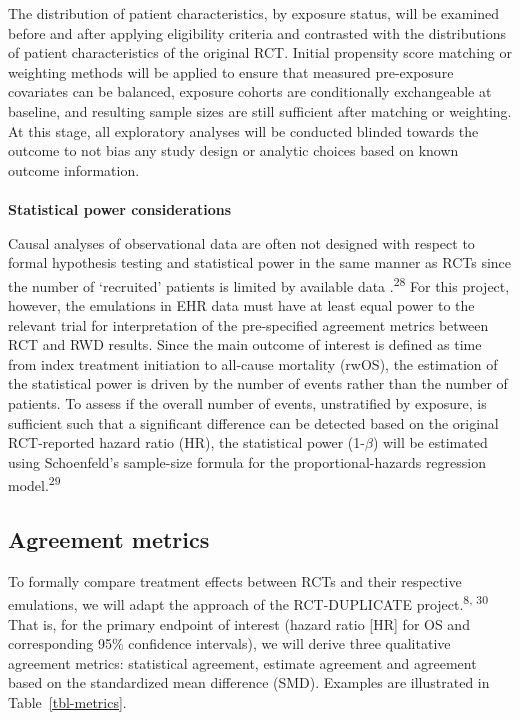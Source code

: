 \documentclass[
  letterpaper,
  DIV=11,
  numbers=noendperiod]{scrartcl}
\makeatletter
\let\oldparagraph\paragraph
\renewcommand{\paragraph}{
    \@ifstar
      \xxxParagraphStar
      \xxxParagraphNoStar
  }
\newcommand{\xxxParagraphStar}[1]{\oldparagraph*{#1}\mbox{}}
\newcommand{\xxxParagraphNoStar}[1]{\oldparagraph{#1}\mbox{}}
\makeatother
\begin{document}
The distribution of patient characteristics, by exposure status, will be
examined before and after applying eligibility criteria and contrasted
with the distributions of patient characteristics of the original RCT.
Initial propensity score matching or weighting methods will be applied
to ensure that measured pre-exposure covariates can be balanced,
exposure cohorts are conditionally exchangeable at baseline, and
resulting sample sizes are still sufficient after matching or weighting.
At this stage, all exploratory analyses will be conducted blinded
towards the outcome to not bias any study design or analytic choices
based on known outcome information.

\paragraph{\texorpdfstring{\textbf{Statistical power
considerations}}{Statistical power considerations}}\label{statistical-power-considerations}

Causal analyses of observational data are often not designed with
respect to formal hypothesis testing and statistical power in the same
manner as RCTs since the number of `recruited' patients is limited by
available data .\textsuperscript{28} For this project, however, the
emulations in EHR data must have at least equal power to the relevant
trial for interpretation of the pre-specified agreement metrics between
RCT and RWD results. Since the main outcome of interest is defined as
time from index treatment initiation to all-cause mortality (rwOS), the
estimation of the statistical power is driven by the number of events
rather than the number of patients. To assess if the overall number of
events, unstratified by exposure, is sufficient such that a significant
difference can be detected based on the original RCT-reported hazard
ratio (HR), the statistical power (1-\(\beta\)) will be estimated using
Schoenfeld's sample-size formula for the proportional-hazards regression
model.\textsuperscript{29}

\subsection{Agreement metrics}\label{sec-agreement-metrics}

To formally compare treatment effects between RCTs and their respective
emulations, we will adapt the approach of the RCT-DUPLICATE
project.\textsuperscript{8, 30} That is, for the primary endpoint of
interest (hazard ratio {[}HR{]} for OS and corresponding 95\% confidence
intervals), we will derive three qualitative agreement metrics:
statistical agreement, estimate agreement and agreement based on the
standardized mean difference (SMD). Examples are illustrated in
Table~\ref{tbl-metrics}.
\end{document}
